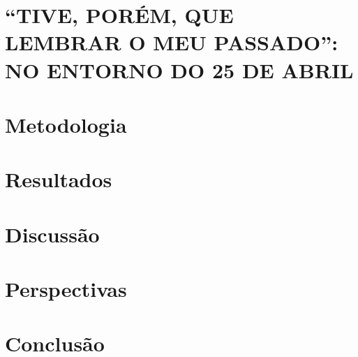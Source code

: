 \documentclass[
	12pt,				%
	oneside,
	a4paper,			%
	english,			%
	spanish,			%
	brazil				%
	]{abntex2}
\begin{document}
\chapter[“TIVE, PORÉM, QUE LEMBRAR O MEU PASSADO”]{“TIVE, PORÉM, QUE LEMBRAR O MEU PASSADO”: NO ENTORNO DO 25 DE ABRIL}



\chapter{Metodologia}

%

\chapter{Resultados}

%

\chapter{Discussão}

%

\chapter{Perspectivas}

%

\chapter{Conclusão}

%

\postextual


%
%
\end{document}
